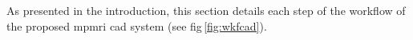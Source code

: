 \documentclass[a4paper,num-refs]{wiley-article}
\begin{document}





As presented in the introduction, this section details each step of the
workflow of the proposed \ac{mpmri} \ac{cad} system (see
\acs{fig}\,\ref{fig:wkfcad}).
\end{document}
